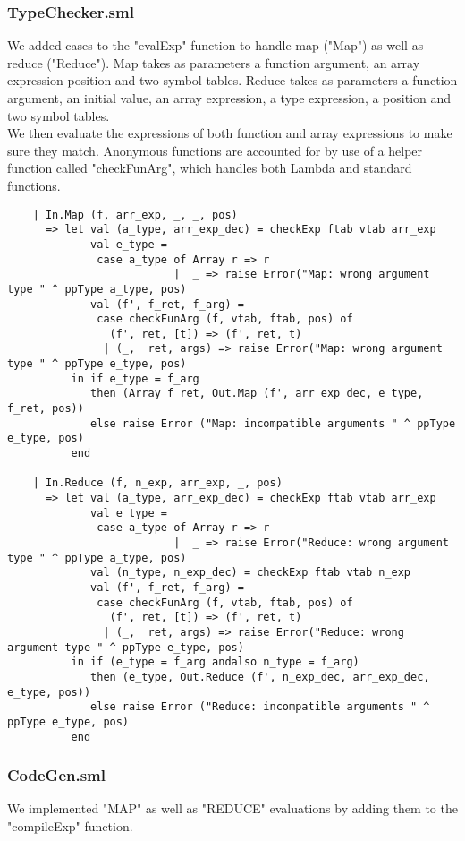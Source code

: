 \documentclass[12pt]{article}
\begin{document}
\subsubsection{TypeChecker.sml}
We added cases to the "evalExp" function to handle map ("Map") as well as reduce ("Reduce"). Map takes as parameters a function argument, an array expression position and two symbol tables. Reduce takes as parameters a function argument, an initial value, an array expression, a type expression, a position and two symbol tables.\\

We then evaluate the expressions of both function and array expressions to make sure they match. Anonymous functions are accounted for by use of a helper function called "checkFunArg", which handles both Lambda and standard functions. 
\begin{verbatim}
    | In.Map (f, arr_exp, _, _, pos)
      => let val (a_type, arr_exp_dec) = checkExp ftab vtab arr_exp
             val e_type = 
              case a_type of Array r => r
                          |  _ => raise Error("Map: wrong argument type " ^ ppType a_type, pos)
             val (f', f_ret, f_arg) = 
              case checkFunArg (f, vtab, ftab, pos) of
                (f', ret, [t]) => (f', ret, t)
               | (_,  ret, args) => raise Error("Map: wrong argument type " ^ ppType e_type, pos)
          in if e_type = f_arg 
             then (Array f_ret, Out.Map (f', arr_exp_dec, e_type, f_ret, pos))
             else raise Error ("Map: incompatible arguments " ^ ppType e_type, pos)
          end
          
    | In.Reduce (f, n_exp, arr_exp, _, pos)
      => let val (a_type, arr_exp_dec) = checkExp ftab vtab arr_exp
             val e_type = 
              case a_type of Array r => r
                          |  _ => raise Error("Reduce: wrong argument type " ^ ppType a_type, pos)
             val (n_type, n_exp_dec) = checkExp ftab vtab n_exp
             val (f', f_ret, f_arg) = 
              case checkFunArg (f, vtab, ftab, pos) of
                (f', ret, [t]) => (f', ret, t)
               | (_,  ret, args) => raise Error("Reduce: wrong argument type " ^ ppType e_type, pos)
          in if (e_type = f_arg andalso n_type = f_arg)
             then (e_type, Out.Reduce (f', n_exp_dec, arr_exp_dec, e_type, pos))
             else raise Error ("Reduce: incompatible arguments " ^ ppType e_type, pos)
          end
\end{verbatim}
\subsubsection{CodeGen.sml}
We implemented "MAP" as well as "REDUCE" evaluations by adding them to the "compileExp" function. \\
\end{document}
